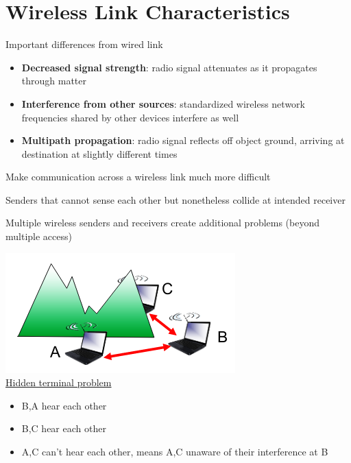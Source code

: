 \documentclass{article}[18pt]
\begin{document}
\section{Wireless Link Characteristics}
Important differences from wired link
\begin{itemize}
	\item \textbf{Decreased signal strength}: radio signal attenuates as it propagates through matter
	\item \textbf{Interference from other sources}: standardized wireless network frequencies shared by other devices interfere as well
	\item \textbf{Multipath propagation}: radio signal reflects off object ground, arriving at destination at slightly different times
\end{itemize}
Make communication across a wireless link much more difficult
\begin{defin}
Senders that cannot sense each other but nonetheless collide at intended receiver
\end{defin}
Multiple wireless senders and receivers create additional problems (beyond multiple access)\\
\begin{minipage}{0.5\textwidth}
\includegraphics[scale=0.7]{"hidden terminal"}\\
\underline{Hidden terminal problem}
\begin{itemize}
	\item B,A hear each other
	\item B,C hear each other
	\item A,C can't hear each other, means A,C unaware of their interference at B 
\end{itemize}
\end{minipage}
\end{document}
